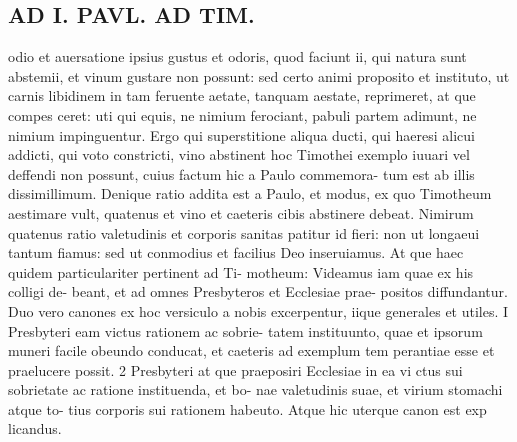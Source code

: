 \documentclass{article}
\begin{document}
\begin{pages}
\section*{AD I. PAVL. AD TIM. }odio et auersatione ipsius gustus et odoris, quod faciunt ii, qui natura sunt abstemii, et vinum gustare non possunt: sed certo animi proposito et instituto, ut carnis libidinem in tam feruente aetate, tanquam aestate, reprimeret, at que compes ceret: uti qui equis, ne nimium ferociant, pabuli partem adimunt, ne nimium impinguentur. Ergo qui superstitione aliqua ducti, qui haeresi alicui addicti, qui voto constricti, vino abstinent hoc Timothei exemplo iuuari vel deffendi non possunt, cuius factum hic a Paulo commemora- tum est ab illis dissimillimum. Denique ratio addita est a Paulo, et modus, ex quo Timotheum aestimare vult, quatenus et vino et caeteris cibis abstinere debeat. Nimirum quatenus ratio valetudinis et corporis sanitas patitur id fieri: non ut longaeui tantum fiamus: sed ut conmodius et facilius Deo inseruiamus. At que haec quidem particulariter pertinent ad Ti- motheum: Videamus iam quae ex his colligi de- beant, et ad omnes Presbyteros et Ecclesiae prae- positos diffundantur. Duo vero canones ex hoc versiculo a nobis excerpentur, iique generales et utiles. I Presbyteri eam victus rationem ac sobrie- tatem instituunto, quae et ipsorum muneri facile obeundo conducat, et caeteris ad exemplum tem perantiae esse et praelucere possit. 2 Presbyteri at que praeposiri Ecclesiae in ea vi ctus sui sobrietate ac ratione instituenda, et bo- nae valetudinis suae, et virium stomachi atque to- tius corporis sui rationem habeuto. Atque hic uterque canon est exp licandus. 

\end{pages}
\end{document}
